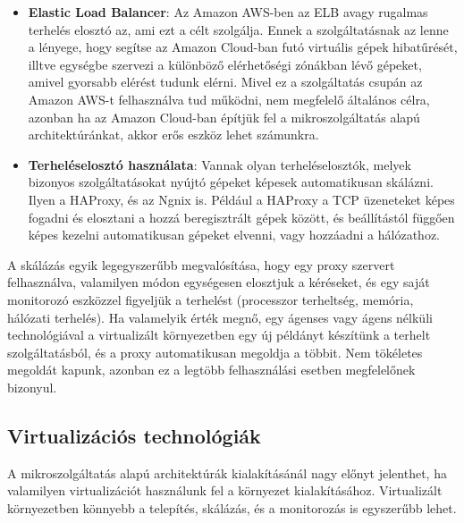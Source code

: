 \documentclass[11pt,magyar,a4paper,twoside,]{report}
\begin{document}
\begin{itemize}
\item
  \textbf{Elastic Load Balancer}\citep{elastic-load-balance}: Az Amazon
  AWS-ben az ELB avagy rugalmas terhelés elosztó az, ami ezt a célt
  szolgálja. Ennek a szolgáltatásnak az lenne a lényege, hogy segítse az
  Amazon Cloud-ban futó virtuális gépek hibatűrését, illtve egységbe
  szervezi a különböző elérhetőségi zónákban lévő gépeket, amivel
  gyorsabb elérést tudunk elérni. Mivel ez a szolgáltatás csupán az
  Amazon AWS-t felhasználva tud működni, nem megfelelő általános célra,
  azonban ha az Amazon Cloud-ban építjük fel a mikroszolgáltatás alapú
  architektúránkat, akkor erős eszköz lehet számunkra.
\item
  \textbf{Terheléselosztó használata}: Vannak olyan terheléselosztók,
  melyek bizonyos szolgáltatásokat nyújtó gépeket képesek automatikusan
  skálázni. Ilyen a HAProxy, és az Ngnix is. Például a HAProxy a TCP
  üzeneteket képes fogadni és elosztani a hozzá beregisztrált gépek
  között, és beállítástól függően képes kezelni automatikusan gépeket
  elvenni, vagy hozzáadni a hálózathoz.
\end{itemize}

A skálázás egyik legegyszerűbb megvalósítása, hogy egy proxy szervert
felhasználva, valamilyen módon egységesen elosztjuk a kéréseket, és egy
saját monitorozó eszközzel figyeljük a terhelést (processzor terheltség,
memória, hálózati terhelés). Ha valamelyik érték megnő, egy ágenses vagy
ágens nélküli technológiával a virtualizált környezetben egy új példányt
készítünk a terhelt szolgáltatásból, és a proxy automatikusan megoldja a
többit. Nem tökéletes megoldát kapunk, azonban ez a legtöbb
felhasználási esetben megfelelőnek bizonyul.

\subsection{Virtualizációs
technológiák}\label{virtualizuxe1ciuxf3s-technoluxf3giuxe1k}

A mikroszolgáltatás alapú architektúrák kialakításánál nagy előnyt
jelenthet, ha valamilyen virtualizációt használunk fel a környezet
kialakításához. Virtualizált környezetben könnyebb a telepítés,
skálázás, és a monitorozás is egyszerűbb lehet.
\end{document}
